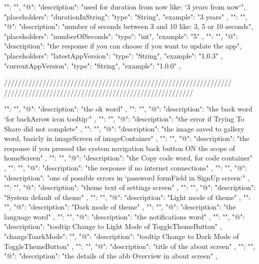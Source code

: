 

  "": "",
  "@": {
    "description": "used for duration from now like: `3 years from now`",
    "placeholders": {
      "durationInString": {
        "type": "String",
        "example": "3 years"
      }
    }
  },
  "": "",
  "@": {
    "description": "number of seconds between 3 and 10 like: 3, 5 or 10 seconds",
    "placeholders": {
      "numberOfSeconds": {
        "type": "int",
        "example": "5"
      }
    }
  },
  "": "",
  "@": {
    "description": "the response if you can choose if you want to update the app",
    "placeholders": {
      "latestAppVersion": {
        "type": "String",
        "example": "1.0.3"
      },
      "currentAppVersion": {
        "type": "String",
        "example": "1.0.0"
      }
    }
  },

/////////////////////////////////////////////////////////////////
//////////////////////////////////////////////////////

  "": "",
  "@": {
    "description": "the ok word"
  },
  "": "",
  "@": {
    "description": "the back word `for backArrow icon tooltip`"
  },
"": "",
  "@": {
    "description": "the error if Trying To Share did not complete"
  },
"": "",
  "@": {
    "description": "the image saved to gallery word, basicly in imageScreen of imageContainer"
  },
"": "",
  "@": {
    "description": "the response if you pressed the system navigation back button ON the scope of homeScreen"
  },
"": "",
  "@": {
    "description": "the Copy code word, for code container"
  },
"": "",
  "@": {
    "description": "the response if no internet connections"
  },
"": "",
  "@": {
    "description": "one of possible errors in `password formField in SignUp screen`"
  },
"": "",
  "@": {
  "description": "theme text of settings screen"
  },
  "": "",
  "@": {
    "description": "System default of theme"
  },
  "": "",
  "@": {
    "description": "Light mode of theme"
  },
  "": "",
  "@": {
    "description": "Dark mode of theme"
  },
  "": "",
  "@": {
    "description": "the language word"
  },
  "": "",
  "@": {
    "description": "the notifications word"
  },
"": "",
  "@": {
    "description": "tooltip Change to Light Mode of ToggleThemeButton"
  },
  "changeToarkMode": "",
  "@": {
    "description": "tooltip Change to Dark Mode of ToggleThemeButton"
  },
"": "",
  "@": {
    "description": "title of the about screen"
  },
  "": "",
  "@": {
    "description": "the details of the abb Overview in about screen"
  },